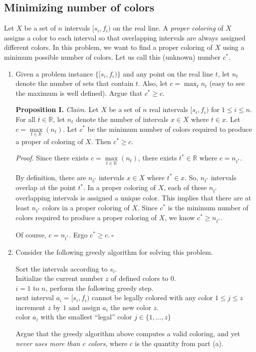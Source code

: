 \subsection{Minimizing number of colors}
Let $X$ be a set of $n$ intervals $[s_i, f_i)$ on the real line. A {\em proper coloring} of $X$ assigns a color to each interval so that overlapping intervals are always assigned different colors.  In this problem, we want to find a proper coloring of $X$ using a minimum possible number of colors. Let us call this (unknown) number $c^*$.
\begin{enumerate}
\item Given a problem instance $\{[s_i,f_i)\}$ and any point on the real line $t$, let $n_t$ denote the number of sets that contain $t$. Also, let $c = \max_t n_t$ (easy to see the maximum is well defined). Argue that $c^*\ge c$.
\begin{solution}
\textbf{Proposition I. }
\textit{Claim. }Let $X$ be a set of $n$ real intervals $[s_i,f_i)$ for $1\leq i\leq n$. For all $t\in\mathbb{R}$, let $n_t$ denote the number of intervals $x\in X$ where $t\in x$. Let $c=\underset{t\in\mathbb{R}}{\max}(n_t)$. Let $c^*$ be the minimum number of colors required to produce a proper of coloring of $X$. Then $c^*\geq c$.

\textit{Proof. }Since there exists $c=\underset{t\in\mathbb{R}}{\max}(n_t)$, there exists $t^*\in\mathbb{R}$ where $c=n_{t^*}$.

By definition, there are $n_{t^*}$ intervals $x\in X$ where $t^*\in x$. So, $n_{t^*}$ intervals overlap at the point $t^*$. In a proper coloring of $X$, each of these $n_{t^*}$ overlapping intervals is assigned a unique color. This implies that there are at least $n_{t^*}$ colors in a proper coloring of $X$. Since $c^*$ is the minimum number of colors required to produce a proper coloring of $X$, we know $c^*\geq n_{t^*}$.

Of course, $c=n_{t^*}$. Ergo $c^*\geq c.~\square$
\end{solution}
\newpage
\item Consider the following greedy algorithm for solving this problem.
\vspace*{-1ex}
\begin{code}
\> Sort the intervals according to $s_i$. \\
\> Initialize the current number $z$ of defined colors to $0$. \\
\> \For $i = 1$ to $n$, perform the following greedy step. \\
\> \> \If next interval $a_i = [s_i, f_i)$ cannot be legally colored
with any color $1\le j\le z$\\
\> \> \Then increment $z$ by $1$ and assign $a_i$ the new color $z$.\\
\> \> \Else color $a_i$ with the smallest ``legal'' color
$j\in \{1, \ldots, z\}$
\end{code}
Argue that the greedy algorithm above computes a valid coloring, and yet {\em never uses more than $c$ colors}, where $c$ is the quantity from part (a).%
\begin{solution}


\end{solution}
\end{enumerate}
